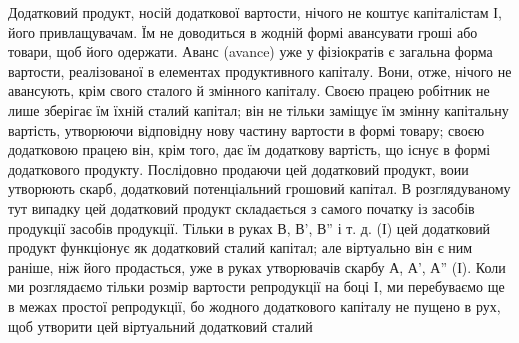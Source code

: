 Додатковий продукт, носій додаткової вартости, нічого не коштує
капіталістам І, його привлащувачам. Їм не доводиться в жодній формі
авансувати гроші або товари, щоб його одержати. Аванс (avance)
уже у фізіократів є загальна форма вартости, реалізованої в елементах
продуктивного капіталу. Вони, отже, нічого не авансують, крім свого сталого
й змінного капіталу. Своєю працею робітник не лише зберігає їм
їхній сталий капітал; він не тільки заміщує їм змінну капітальну вартість,
утворюючи відповідну нову частину вартости в формі товару; своєю додатковою
працею він, крім того, дає їм додаткову вартість, що існує
в формі додаткового продукту. Послідовно продаючи цей додатковий
продукт, воии утворюють скарб, додатковий потенціальний грошовий капітал.
В розглядуваному тут випадку цей додатковий продукт складається
з самого початку із засобів продукції засобів продукції. Тільки в руках
В, В', В'' і т. д. (І) цей додатковий продукт функціонує як додатковий
сталий капітал; але віртуально він є ним раніше, ніж його продасться,
уже в руках утворювачів скарбу А, А', А'' (І). Коли ми розглядаємо
тільки розмір вартости репродукції на боці І, ми перебуваємо
ще в межах простої репродукції, бо жодного додаткового капіталу
не пущено в рух, щоб утворити цей віртуальний додатковий сталий
\parbreak{}  %
